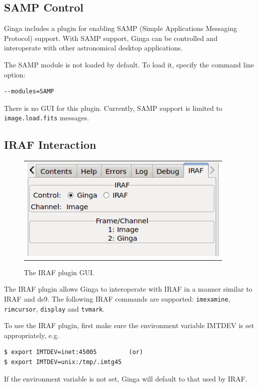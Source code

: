 \documentclass[11pt]{report}
\begin{document}
\subsection{SAMP Control}
\label{sec:SAMP}
Ginga includes a plugin for enabling SAMP (Simple Applications Messaging
Protocol) support.  With SAMP support, Ginga can be controlled and
interoperate with other astronomical desktop applications.

The SAMP module is not loaded by default.  To load it, specify
the command line option:
\begin{verbatim}
--modules=SAMP
\end{verbatim}

There is no GUI for this plugin.
Currently, SAMP support is limited to {\tt image.load.fits} messages.

\subsection{IRAF Interaction}
\label{sec:IRAF}
\begin{figure}
  \begin{center}
    \begin{tabular}{c}
      \includegraphics[width=4in]{IRAF-plugin.png}
    \end{tabular}
  \end{center}
  \caption[example] 
          { \label{fig:IRAF-plugin} 
            The IRAF plugin GUI.} 
\end{figure} 
The IRAF plugin allows Ginga to interoperate with IRAF in a manner
similar to IRAF and ds9.  The following IRAF commands are supported:
{\tt imexamine}, {\tt rimcursor}, {\tt display} and {\tt tvmark}.

To use the IRAF plugin, first make sure the environment variable IMTDEV
is set appropriately, e.g.
\begin{verbatim}
$ export IMTDEV=inet:45005         (or)
$ export IMTDEV=unix:/tmp/.imtg45
\end{verbatim}
If the environment variable is not set, Ginga will default to that used
by IRAF. 
    
\end{document}
